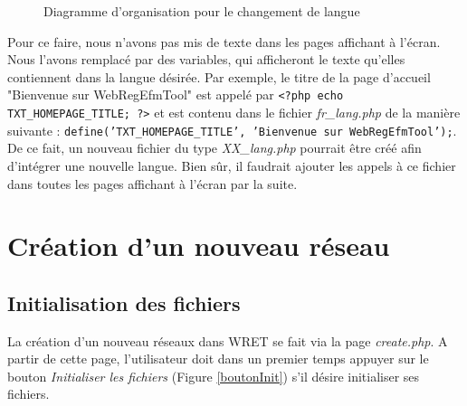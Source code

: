 \begin{figure}[!ht]
	\begin{center}
		\caption{Diagramme d'organisation pour le changement de langue}
  		\label{DiagLangues}
  	\end{center}	
\end{figure}

Pour ce faire, nous n'avons pas mis de texte dans les pages affichant à l'écran. Nous l'avons remplacé par des variables, qui afficheront le texte qu'elles contiennent dans la langue désirée. Par exemple, le titre de la page d'accueil "Bienvenue sur WebRegEfmTool" est appelé par \texttt{<?php echo TXT\_HOMEPAGE\_TITLE; ?>} et est contenu dans le fichier \emph{fr\_lang.php} de la manière suivante :
\texttt{define('TXT\_HOMEPAGE\_TITLE', 'Bienvenue sur WebRegEfmTool');}. De ce fait, un nouveau fichier du type \emph{XX\_lang.php} pourrait être créé afin d'intégrer une nouvelle langue. Bien sûr, il faudrait ajouter les appels à ce fichier dans toutes les pages affichant à l'écran par la suite. 

\section{Création d'un nouveau réseau}

\subsection{Initialisation des fichiers}
La création d'un nouveau réseaux dans WRET se fait via la page \emph{create.php}.
A partir de cette page, l'utilisateur doit dans un premier temps appuyer sur le bouton \emph{Initialiser les fichiers} (Figure \ref{boutonInit}) s'il désire initialiser ses fichiers.

